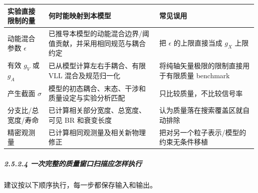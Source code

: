 \documentclass[
  chinese,
  UTF8]{ctexart}
\newcounter{none} %
\begin{document}
{\def\LTcaptype{none} %
\begin{longtable}[]{@{}
  >{\raggedright\arraybackslash}p{}
  >{\raggedright\arraybackslash}p{}
  >{\raggedright\arraybackslash}p{}@{}}
\toprule\noalign{}
\begin{minipage}[b]{\linewidth}\raggedright
实验直接限制的量
\end{minipage} & \begin{minipage}[b]{\linewidth}\raggedright
何时能映射到本模型
\end{minipage} & \begin{minipage}[b]{\linewidth}\raggedright
常见误用
\end{minipage} \\
\midrule\noalign{}
\endhead
\bottomrule\noalign{}
\endlastfoot
动能混合参数 \(\epsilon\) &
已推导本模型的动能混合边界/阈值贡献，并采用相同规范与耦合约定 & 把
\(\epsilon\) 的上限直接当成 \(g_X\) 上限 \\
有效 \(g_V\) 或 \(g_A\) & 已从模型计算左右手耦合、有限 VLL
混合及规范归一化 & 将纯轴矢量极限的限制直接用于有限质量 benchmark \\
产生截面 \(\sigma\) & 模型的初态耦合、末态、干涉和质量设定与实验分析匹配
& 只比较质量，不比较信号率 \\
分支比/总宽度/寿命 & 已计算相关部分宽度、总宽度、可见 BR 和衰变长度 &
认为质量落在搜索覆盖区就自动排除 \\
精密观测量 & 已计算相同观测量及相关新物理修正 &
把对另一个粒子表示/模型的约束无条件移植 \\
\end{longtable}
}

\subparagraph{2.5.2.4
一次完整的质量窗口扫描应怎样执行}\label{ux4e00ux6b21ux5b8cux6574ux7684ux8d28ux91cfux7a97ux53e3ux626bux63cfux5e94ux600eux6837ux6267ux884c}

建议按以下顺序执行，每一步都保存输入和输出。
\end{document}
